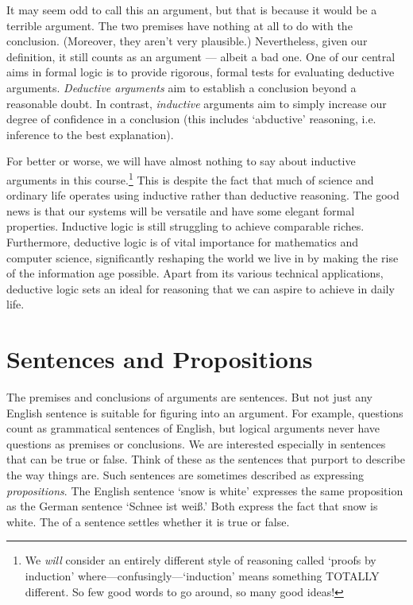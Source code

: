 It may seem odd to call this an argument, but that is because it would be a {terrible} argument. The two premises have nothing at all to do with the conclusion. (Moreover, they aren't very plausible.) Nevertheless, given our definition, it still counts as an argument --- albeit a bad one. One of our central aims in formal logic is to provide rigorous, formal tests for evaluating deductive arguments. \textit{Deductive arguments} aim to establish a conclusion beyond a reasonable doubt. In contrast, \textit{inductive} arguments aim to simply increase our degree of confidence in a conclusion (this includes `abductive' reasoning, i.e. inference to the best explanation). 

For better or worse, we will have almost nothing to say about inductive arguments in this course.\footnote{We \textit{will} consider an entirely different style of reasoning called `proofs by induction' where---confusingly---`induction' means something TOTALLY different. So few good words to go around, so many good ideas!} This is despite the fact that much of science and ordinary life operates using inductive rather than deductive reasoning. The good news is that our systems will be versatile and have some elegant formal properties. Inductive logic is still struggling to achieve comparable riches. Furthermore, deductive logic is of vital importance for mathematics and computer science, significantly reshaping the world we live in by making the rise of the information age possible. Apart from its various technical applications, deductive logic sets an ideal for reasoning that we can aspire to achieve in daily life.


\section{Sentences and Propositions}
\label{intro.sentences}

The premises and conclusions of arguments are sentences. But not just any English sentence is suitable for figuring into an argument. For example, questions count as grammatical sentences of English, but logical arguments never have questions as premises or conclusions. We are interested especially in sentences that can be true or false. Think of these as the sentences that purport to describe the way things are. Such sentences are sometimes described as expressing \emph{propositions}. The English sentence `snow is white' expresses the same proposition as the German sentence `Schnee ist wei\ss.' Both express the fact that snow is white. The  of a sentence settles whether it is true or false.

